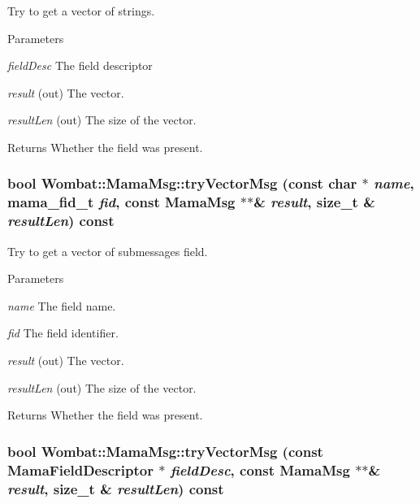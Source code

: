 Try to get a vector of strings. 
\begin{DoxyParams}{Parameters}
\item[{\em fieldDesc}]The field descriptor \item[{\em result}](out) The vector. \item[{\em resultLen}](out) The size of the vector. \end{DoxyParams}
\begin{DoxyReturn}{Returns}
Whether the field was present. 
\end{DoxyReturn}
\hypertarget{classWombat_1_1MamaMsg_aceeef571c12d1cf4087acd6690efa5cb}{
\subsubsection[{tryVectorMsg}]{\setlength{\rightskip}{0pt plus 5cm}bool Wombat::MamaMsg::tryVectorMsg (const char $\ast$ {\em name}, \/  mama\_\-fid\_\-t {\em fid}, \/  const {\bf MamaMsg} $\ast$$\ast$\& {\em result}, \/  size\_\-t \& {\em resultLen}) const}}
\label{classWombat_1_1MamaMsg_aceeef571c12d1cf4087acd6690efa5cb}


Try to get a vector of submessages field. 
\begin{DoxyParams}{Parameters}
\item[{\em name}]The field name. \item[{\em fid}]The field identifier. \item[{\em result}](out) The vector. \item[{\em resultLen}](out) The size of the vector. \end{DoxyParams}
\begin{DoxyReturn}{Returns}
Whether the field was present. 
\end{DoxyReturn}
\hypertarget{classWombat_1_1MamaMsg_a2ea378cc414893c92de2bdf0de4e09dc}{
\subsubsection[{tryVectorMsg}]{\setlength{\rightskip}{0pt plus 5cm}bool Wombat::MamaMsg::tryVectorMsg (const {\bf MamaFieldDescriptor} $\ast$ {\em fieldDesc}, \/  const {\bf MamaMsg} $\ast$$\ast$\& {\em result}, \/  size\_\-t \& {\em resultLen}) const}}
\label{classWombat_1_1MamaMsg_a2ea378cc414893c92de2bdf0de4e09dc}


